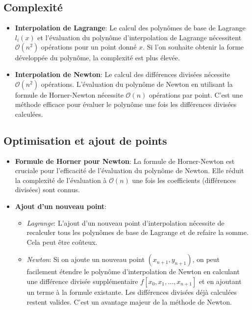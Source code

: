 \documentclass{article}
\begin{document}
\subsection{Complexité}

\begin{itemize}
    \item \textbf{Interpolation de Lagrange}: Le calcul des polynômes de base de Lagrange $l_i(x)$ et l'évaluation du polynôme d'interpolation de Lagrange nécessitent $\mathcal{O}(n^2)$ opérations pour un point donné $x$. Si l'on souhaite obtenir la forme développée du polynôme, la complexité est plus élevée.
    \item \textbf{Interpolation de Newton}: Le calcul des différences divisées nécessite $\mathcal{O}(n^2)$ opérations. L'évaluation du polynôme de Newton en utilisant la formule de Horner-Newton nécessite $\mathcal{O}(n)$ opérations par point. C'est une méthode efficace pour évaluer le polynôme une fois les différences divisées calculées.
\end{itemize}

\subsection{Optimisation et ajout de points}

\begin{itemize}
    \item \textbf{Formule de Horner pour Newton}: La formule de Horner-Newton est cruciale pour l'efficacité de l'évaluation du polynôme de Newton. Elle réduit la complexité de l'évaluation à $\mathcal{O}(n)$ une fois les coefficients (différences divisées) sont connus.
    \item \textbf{Ajout d'un nouveau point}:
    \begin{itemize}
        \item \textit{Lagrange}: L'ajout d'un nouveau point d'interpolation nécessite de recalculer tous les polynômes de base de Lagrange et de refaire la somme. Cela peut être coûteux.
        \item \textit{Newton}:  Si on ajoute un nouveau point $(x_{n+1}, y_{n+1})$, on peut facilement étendre le polynôme d'interpolation de Newton en calculant une différence divisée supplémentaire $f[x_0, x_1, \dots, x_{n+1}]$ et en ajoutant un terme à la formule existante. Les différences divisées déjà calculées restent valides. C'est un avantage majeur de la méthode de Newton.
    \end{itemize}
\end{itemize}
\end{document}

